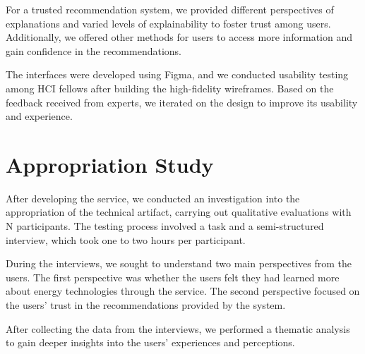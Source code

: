For a trusted recommendation system, we provided different perspectives of explanations and varied levels of explainability to foster trust among users.
Additionally, we offered other methods for users to access more information and gain confidence in the recommendations.

The interfaces were developed using Figma, and we conducted usability testing among HCI fellows after building the high-fidelity wireframes. 
Based on the feedback received from experts, we iterated on the design to improve its usability and experience.


\section{Appropriation Study}

After developing the service, 
we conducted an investigation into the appropriation of the technical artifact, carrying out qualitative evaluations with N participants. 
The testing process involved a task and a semi-structured interview, which took one to two hours per participant.

During the interviews, we sought to understand two main perspectives from the users. 
The first perspective was whether the users felt they had learned more about energy technologies through the service. 
The second perspective focused on the users' trust in the recommendations provided by the system.

After collecting the data from the interviews, we performed a thematic analysis to gain deeper insights into the users' experiences and perceptions. 


